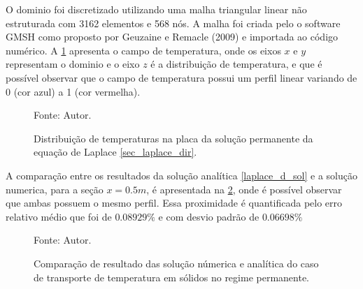 O dominio foi discretizado utilizando uma malha triangular linear não estruturada com 3162 elementos e 568 nós.
A malha foi criada pelo o software GMSH como proposto por Geuzaine e Remacle (2009)\cite{gmsh} e importada ao código numérico.
A \ref{laplace_d_3d} apresenta o campo de temperatura, onde os eixos $x$ e $y$ representam o dominio e o eixo $z$ é a distribuição de temperatura, e que é possível observar que o campo de temperatura possui um perfil linear variando de 0 (cor azul) a 1 (cor vermelha).
\begin{figure}[H]
    \centering
     {\raggedleft \scriptsize Fonte: Autor.}
    \caption{Distribuição de temperaturas na placa da solução permanente da equação de Laplace \ref{sec_laplace_dir}.}
    \label{laplace_d_3d}
\end{figure}

A comparação entre os resultados da solução analítica \eqref{laplace_d_sol} e a solução numerica, para a seção $x=0.5m$, é apresentada na \ref{laplace_d_perm_comp}, onde é possível observar que ambas possuem o mesmo perfil.
Essa proximidade é quantificada pelo erro relativo médio que foi de $0.08929\%$ e com desvio padrão de $0.06698\%$
\begin{figure}[H]
    \centering
     {\raggedleft \scriptsize Fonte: Autor.}
    \caption{Comparação de resultado das solução númerica e analítica do caso de transporte de temperatura em sólidos no regime permanente.}
    \label{laplace_d_perm_comp}
\end{figure}

